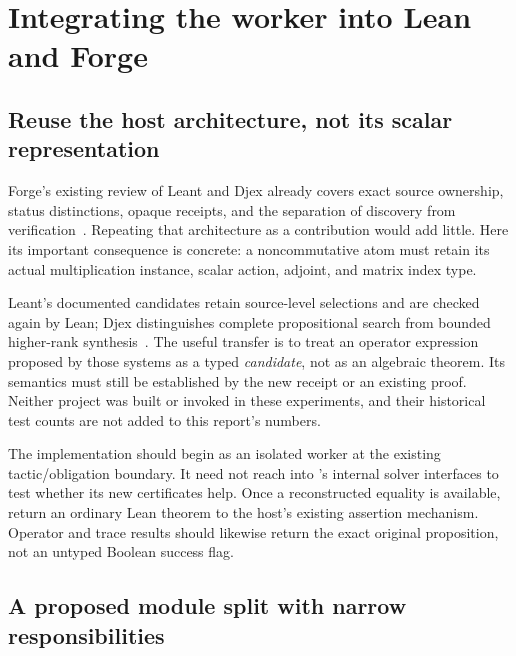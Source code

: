 \section{Integrating the worker into Lean and Forge}
\label{sec:integration}

\subsection{Reuse the host architecture, not its scalar representation}

Forge's existing review of Leant and Djex already covers exact source ownership,
status distinctions, opaque receipts, and the separation of discovery from
verification~\cite{forge-leant}. Repeating that architecture as a contribution
would add little. Here its important consequence is concrete: a noncommutative
atom must retain its actual multiplication instance, scalar action, adjoint,
and matrix index type.

Leant's documented candidates retain source-level selections and are checked
again by Lean; Djex distinguishes complete propositional search from bounded
higher-rank synthesis~\cite{leant,djex}. The useful transfer is to treat an
operator expression proposed by those systems as a typed \emph{candidate}, not
as an algebraic theorem. Its semantics must still be established by the new
receipt or an existing proof. Neither project was built or invoked in these
experiments, and their historical test counts are not added to this report's
numbers.

The implementation should begin as an isolated  worker at the
existing tactic/obligation boundary. It need not reach into 's
internal solver interfaces to test whether its new certificates help. Once a
reconstructed equality is available, return an ordinary Lean theorem to the
host's existing assertion mechanism. Operator and trace results should likewise
return the exact original proposition, not an untyped Boolean success flag.

\subsection{A proposed module split with narrow responsibilities}

